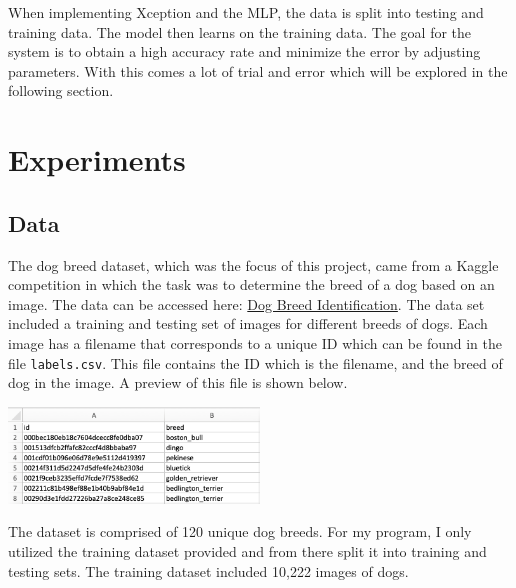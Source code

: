 \documentclass[12pt]{article}
\begin{document}
When implementing Xception and the MLP, the data is split into testing and training data.  The model then learns on the training data.  The goal for the system is to obtain a high accuracy rate and minimize the error by adjusting parameters.  With this comes a lot of trial and error which will be explored in the following section.

\section{Experiments}
\subsection{Data}
\quad The dog breed dataset, which was the focus of this project, came from a Kaggle competition in which the task was to determine the breed of a dog based on an image.  The data can be accessed here: \href{https://www.kaggle.com/c/dog-breed-identification}{Dog Breed Identification}.  The data set included a training and testing set of images for different breeds of dogs.  Each image has a filename that corresponds to a unique ID which can be found in the file \verb|labels.csv|.  This file contains the ID which is the filename, and the breed of dog in the image.  A preview of this file is shown below.
\begin{center}
     \includegraphics[width=0.5\textwidth]{labels.jpg}
\end{center}
The dataset is comprised of 120 unique dog breeds.  For my program, I only utilized the training dataset provided and from there split it into training and testing sets.  The training dataset included 10,222 images of dogs.
\end{document}
